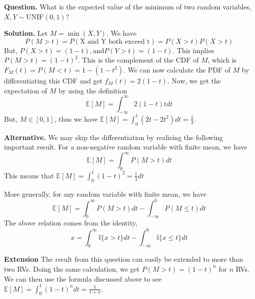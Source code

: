 \textbf{Question.} What is the expected value of the minimum of two random variables, $X, Y \sim \text{UNIF}(0,1)$?

\textbf{Solution.} Let $M = \min(X,Y)$. We have 
\[P(M > t) = P(\text{X and Y both exceed t}) = P(X > t) P(X > t)\]
But, $P(X > t) = (1-t), \text{and} P(Y > t) = (1-t)$. This implies $P(M>t) = (1-t)^2$. This is the complement of the CDF of $M$, which is $F_M(t) = P(M < t) = 1 - (1-t^2)$.
We can now calculate the PDF of $M$ by differentiating this CDF and get 
$f_M (t) = 2(1-t)$. Now, we get the expectation of $M$ by using the definition 
\[\mathbb{E}[M] = \int_{-\infty}^{\infty} 2(1-t) t dt \]
But, $M \in [0,1]$, thus we have $\mathbb{E}[M] = \int_{0}^{1} (2t - 2t^2) dt = \frac{1}{3}$.

\textbf{Alternative.} We may skip the differentiation by realising the following important result. For a non-negative random variable with finite mean, we have 
\[\mathbb{E} [M] = \int_{0}^{\infty} P(M > t) dt \]
This means that $\mathbb{E}[M] = \int_{0}^{1} (1-t)^2 = \frac{1}{3} dt$

More generally, for any random variable with finite mean, we have \[
\mathbb{E} [M] = \int_{0}^{\infty} P(M > t) dt - \int_{-\infty}^{0} P(M \leq t) dt\]
The above relation comes from the identity, 
\[ x = \int_{0}^{\infty} \mathbb{I}\{x > t\} dt - \int_{-\infty}^{0} \mathbb{I} \{x \leq t\} dt\]

\textbf{Extension} The result from this question can easily be extended to more than two RVs. Doing the same calculation, we get $P(M > t) = (1-t)^n$ for $n$ RVs. We can then use the formula discussed above to see $\mathbb{E}[M] = \int_{0}^{1} (1-t)^n dt = \frac{1}{1+n}$.




